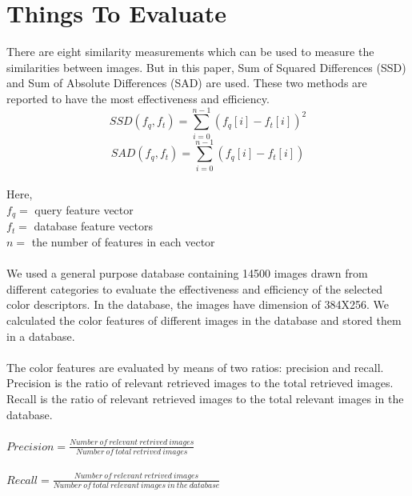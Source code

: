 \documentclass[pstricks,10pt,notitlepage]{report}
\begin{document}
\section{Things To Evaluate}
There are eight similarity measurements which can be used to measure the similarities between images\cite{n9}. But in this paper, Sum of Squared Differences (SSD) and Sum of Absolute Differences (SAD) are used. These two methods are reported to have the most effectiveness and efficiency\cite{n2}. 
\\
\begin{equation}
SSD(f_q,f_t)=\sum_{i=0}^{n-1}(f_q[i]-f_t[i])^2\label{eq:8}
\end{equation}
\begin{equation}
SAD(f_q,f_t)=\sum_{i=0}^{n-1}(f_q[i]-f_t[i])\label{eq:9}
\end{equation}
\\
Here,\\
$f_{q}=$ query feature vector\\
$f_{t}=$ database feature vectors\\
$n=$ the number of features in each vector\\
\\
We used a general purpose database containing 14500 images drawn from different categories to evaluate the effectiveness and efficiency of the selected color descriptors\cite{n11,n12,n13,n14,n15}. In the database, the images have dimension of 384X256. We calculated the color features of different images in the database and stored them in a database.\\
\\
The color features are evaluated by means of two ratios: precision and recall. Precision is the ratio of relevant retrieved images to the total retrieved images. Recall is the ratio of relevant retrieved images to the total relevant images in the database.\\
\\
\large
$Precision=\frac{Number \: of\: relevant\: retrived\: images}{Number \: of\: total\: retrived\: images}$\\
\\
$Recall=\frac{Number \: of\: relevant\: retrived\: images}{Number \: of\: total\: relevant\: images \: in \: the\: database}$
\normalfont
\end{document}
